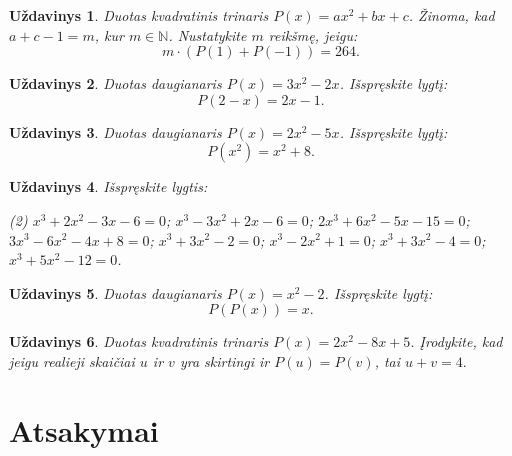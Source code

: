 \documentclass[11pt,a4paper]{scrartcl}
\newtheorem{problem}{Uždavinys}
\begin{document}
\begin{problem}
    Duotas kvadratinis trinaris $P(x) = ax^2+bx+c$. Žinoma, kad $a+c-1= m$, kur $m \in \mathbb{N}$. Nustatykite  $m$ reikšmę, jeigu:
    $$ m \cdot (P(1)+P(-1))=264. $$  
\end{problem}

\begin{problem}
Duotas daugianaris $P(x)=3x^2-2x$. Išspręskite lygtį:
\[
P(2-x)=2x-1.
\]
\end{problem}

\begin{problem}
Duotas daugianaris $P(x)=2x^2-5x$. Išspręskite lygtį:
\[
P(x^2)=x^2+8.
\]
\end{problem}

\begin{problem}
Išspręskite lygtis:
\begin{tasks}(2)
    \task $x^3+2x^2-3x-6=0$;
    \task $x^3-3x^2+2x-6=0$;
    \task $2x^3+6x^2-5x-15=0$;
    \task $3x^3-6x^2-4x+8=0$;
    \task $x^3+3x^2-2=0$;
    \task $x^3-2x^2+1=0$;
    \task $x^3+3x^2-4=0$;
    \task $x^3+5x^2-12=0$.
\end{tasks}
\end{problem}


\begin{problem}
   Duotas daugianaris $P(x)=x^2-2$. Išspręskite lygtį:
$$
P(P(x))=x.
$$
\end{problem}

\begin{problem}
Duotas kvadratinis trinaris $P(x)=2x^2-8x+5$.
Įrodykite, kad jeigu realieji skaičiai $u$ ir $v$
yra skirtingi ir $P(u)=P(v)$, tai $u+v=4.$

\end{problem}


\clearpage
\section{Atsakymai}
\end{document}
